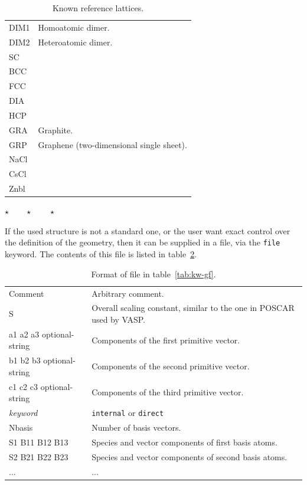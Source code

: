\documentclass[a4paper,12pt,onecolumn]{article}
\newcommand{\stars}{\begin{center} \vspace{0.5cm}$\star \qquad \star \qquad \star$\vspace{0.5cm}\end{center}}
\begin{document}
\begin{table}
\caption{
Known reference lattices.
\label{tab:kw-gf-kl}
}
\begin{center}
\begin{tabular}{|l|l|}
\hline
\hline
DIM1 & Homoatomic dimer. \\
DIM2 & Heteroatomic dimer. \\
SC  & \\
BCC & \\
FCC & \\
DIA & \\
HCP & \\
GRA & Graphite. \\
GRP & Graphene (two-dimensional single sheet). \\
NaCl & \\
CsCl & \\
Znbl & \\
\hline
\hline
\end{tabular}
\end{center}
\end{table}


\stars


If the used structure is not a standard one, or the user want exact control
over the definition of the geometry, then it can be supplied in a file, via
the \verb+file+ keyword. The contents of this file is listed in
table~\ref{tab:kw-gf-ff}.



\begin{table}
\caption{
Format of \textrm{file} in table~\ref{tab:kw-gf}.
\label{tab:kw-gf-ff}
}
\begin{center}
\begin{tabular}{|l|l|}
\hline
\hline
Comment  & Arbitrary comment. \\
S        & Overall scaling constant, similar to the one in POSCAR used by VASP. \\
a1 a2 a3  optional-string  & Components of the first primitive vector. \\
b1 b2 b3  optional-string  & Components of the second primitive vector. \\
c1 c2 c3  optional-string  & Components of the third primitive vector. \\
\textit{keyword}  & \verb+internal+ or \verb+direct+ \\
Nbasis   & Number of basis vectors. \\
S1  B11  B12  B13 & Species and vector components of first basis atoms. \\
S2  B21  B22  B23 & Species and vector components of second basis atoms. \\
...           & ... \\
\hline
\hline
\end{tabular}
\end{center}
\end{table}
\end{document}
